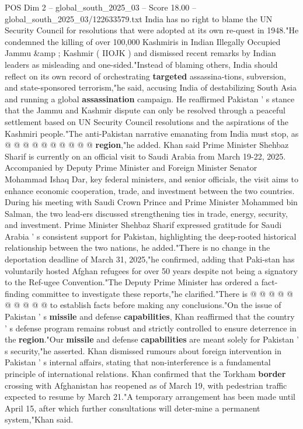 \begin{textsample}{POS Dim 2 – global\_south\_2025\_03 – Score 18.00 – global\_south\_2025\_03/122633579.txt}
India has no right to blame the UN Security Council for resolutions that were adopted at its own re-quest in 1948."He condemned the killing of over 100,000 Kashmiris in Indian Illegally Occupied Jammu \&amp ; Kashmir ( IIOJK ) and dismissed recent remarks by Indian leaders as misleading and one-sided."Instead of blaming others, India should reflect on its own record of orchestrating \textbf{targeted} assassina-tions, subversion, and state-sponsored terrorism,"he said, accusing India of destabilizing South Asia and running a global \textbf{assassination} campaign.
He reaffirmed Pakistan ' s stance that the Jammu and Kashmir dispute can only be resolved through a peaceful settlement based on UN Security Council resolutions and the aspirations of the Kashmiri people."The anti-Pakistan narrative emanating from India must stop, as @ @ @ @ @ @ @ @ @ @ \textbf{region},"he added.
Khan said Prime Minister Shehbaz Sharif is currently on an official visit to Saudi Arabia from March 19-22, 2025.
Accompanied by Deputy Prime Minister and Foreign Minister Senator Mohammad Ishaq Dar, key federal ministers, and senior officials, the visit aims to enhance economic cooperation, trade, and investment between the two countries.
During his meeting with Saudi Crown Prince and Prime Minister Mohammed bin Salman, the two lead-ers discussed strengthening ties in trade, energy, security, and investment.
Prime Minister Shehbaz Sharif expressed gratitude for Saudi Arabia ' s consistent support for Pakistan, highlighting the deep-rooted historical relationship between the two nations, he added."There is no change in the deportation deadline of March 31, 2025,"he confirmed, adding that Paki-stan has voluntarily hosted Afghan refugees for over 50 years despite not being a signatory to the Ref-ugee Convention."The Deputy Prime Minister has ordered a fact-finding committee to investigate these reports,"he clarified."There is @ @ @ @ @ @ @ @ @ @ to establish facts before making any conclusions."On the issue of Pakistan ' s \textbf{missile} and defense \textbf{capabilities}, Khan reaffirmed that the country ' s defense program remains robust and strictly controlled to ensure deterrence in the \textbf{region}."Our \textbf{missile} and defense \textbf{capabilities} are meant solely for Pakistan ' s security,"he asserted.
Khan dismissed rumours about foreign intervention in Pakistan ' s internal affairs, stating that non-interference is a fundamental principle of international relations.
Khan confirmed that the Torkham \textbf{border} crossing with Afghanistan has reopened as of March 19, with pedestrian traffic expected to resume by March 21."A temporary arrangement has been made until April 15, after which further consultations will deter-mine a permanent system,"Khan said.

\end{textsample}
